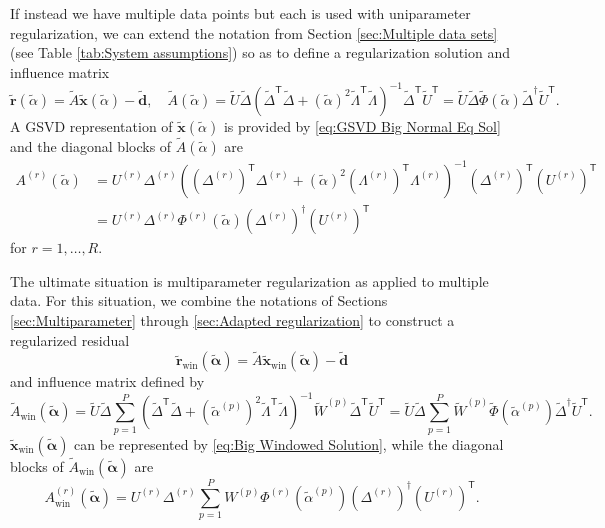 \documentclass[12pt]{article}
\newcommand{\dVec}{\mathbf{d}}	%
\newcommand{\rVec}{\mathbf{r}}	%
\newcommand{\xVec}{\mathbf{x}}	%
\newcommand{\trans}[1]{{#1}^\mathsf{T}}	%
\newcommand{\inv}[1]{{#1}^{-1}}	%
\newcommand{\pinv}[1]{{#1}^\dagger}	%
\newcommand{\regparam}{\alpha}  %
\newcommand{\regparamVec}{\bm{\regparam}}   %
\newcommand{\regparamBig}{\widetilde{\regparam}}   %
\newcommand{\regparamVecBig}{\widetilde{\regparamVec}}   %
\newcommand{\xBig}{\widetilde{\xVec}}	%
\newcommand{\xWinBig}{\xBig_{\text{win}}}	%
\newcommand{\rBig}{\widetilde{\rVec}}	%
\newcommand{\rWinBig}{\rBig_{\text{win}}}	%
\newcommand{\dBig}{\widetilde{\dVec}}	%
\newcommand{\ABig}{\widetilde{A}}	%
\newcommand{\AWin}{A_{\text{win}}}	%
\newcommand{\AWinBig}{\widetilde{A}_{\text{win}}}	%
\begin{document}
If instead we have multiple data points but each is used with uniparameter regularization, we can extend the notation from Section \ref{sec:Multiple data sets} (see Table \ref{tab:System assumptions}) so as to define a regularization solution and influence matrix
\begin{equation}
\label{eq:Big regularized residual}
\rBig(\widetilde{\regparam}) = \ABig\xBig(\widetilde{\regparam}) - \dBig, \quad \ABig(\regparamBig) = \widetilde{U}\widetilde{\Delta}\inv{\left(\trans{\widetilde{\Delta}}\widetilde{\Delta} + \left(\regparamBig\right)^2 \trans{\widetilde{\Lambda}}\widetilde{\Lambda}\right)}\trans{\widetilde{\Delta}}\trans{\widetilde{U}} = \widetilde{U}\widetilde{\Delta}\widetilde{\Phi}\left(\regparamBig\right)\pinv{\widetilde{\Delta}}\trans{\widetilde{U}}.
\end{equation}
A GSVD representation of $\xBig(\widetilde{\regparam})$ is provided by \eqref{eq:GSVD Big Normal Eq Sol} and the diagonal blocks of $\ABig(\regparamBig)$ are
\begin{align}
    A^{(r)}(\regparamBig) &= U^{(r)}\Delta^{(r)}\inv{\left(\trans{\left(\Delta^{(r)}\right)}\Delta^{(r)} + \left(\regparamBig\right)^2 \trans{\left(\Lambda^{(r)}\right)}\Lambda^{(r)}\right)}\trans{\left(\Delta^{(r)}\right)}\trans{\left(U^{(r)}\right)} \nonumber \\ 
    &= U^{(r)}\Delta^{(r)}\Phi^{(r)}\left(\regparamBig\right)\pinv{\left(\Delta^{(r)}\right)}\trans{\left(U^{(r)}\right)} \label{eq:Diagonal blocks}
\end{align}
for $r = 1,\ldots,R$. \par
The ultimate situation is multiparameter regularization as applied to multiple data. For this situation, we combine the notations of Sections \ref{sec:Multiparameter} through \ref{sec:Adapted regularization} to construct a regularized residual
\begin{equation}
\label{eq:Windowed Big regularized residual}
\rWinBig(\regparamVecBig) = \ABig\xWinBig(\regparamVecBig) - \dBig
\end{equation}
and influence matrix defined by
\begin{equation}
    \label{eq:Windowed Big Influence Matrix}
    \AWinBig(\regparamVecBig) = \widetilde{U}\widetilde{\Delta}\sum_{p=1}^{P}\inv{\left(\trans{\widetilde{\Delta}}\widetilde{\Delta} + \left(\regparamBig^{(p)}\right)^2 \trans{\widetilde{\Lambda}}\widetilde{\Lambda}\right)}\widetilde{W}^{(p)}\trans{\widetilde{\Delta}}\trans{\widetilde{U}} = \widetilde{U}\widetilde{\Delta}\sum_{p=1}^{P}\widetilde{W}^{(p)}\widetilde{\Phi}\left(\regparamBig^{(p)}\right)\pinv{\widetilde{\Delta}}\trans{\widetilde{U}}.
\end{equation}
$\xWinBig(\regparamVecBig)$ can be represented by \eqref{eq:Big Windowed Solution}, while the diagonal blocks of $\AWinBig(\regparamVecBig)$ are
\begin{equation}
    \AWin^{(r)}(\regparamVecBig)
    = U^{(r)}\Delta^{(r)}\sum_{p=1}^{P}W^{(p)}\Phi^{(r)}\left(\regparamBig^{(p)}\right)\pinv{\left(\Delta^{(r)}\right)}\trans{\left(U^{(r)}\right)}. \label{eq:Windowed Big Influence Diagonals}
\end{equation}
\end{document}
